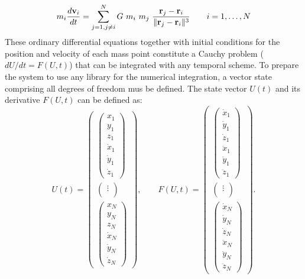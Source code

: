 \begin{equation} 
m_i \frac{d \bold{v}_i}{dt} =  \sum_{j=1, j \ne i} ^N G \ m_i \ m_j \ \frac{\bold{r}_j -\bold{r}_i}
                              {\|\bold{r}_j -\bold{r}_i \|^3}
                              \qquad i=1, \ldots,N 
\label{momentum}                              
\end{equation}
These ordinary differential equations together with initial conditions for the position 
and velocity of each mass point  constitute a Cauchy problem ($dU/dt = F(U,t)$) 
that can be integrated with any temporal scheme. 
To prepare the system to use any library for the numerical integration, a vector state comprising all 
degrees of freedom mus be defined. 
The state vector $ U(t) $ and its derivative $ F(U,t) $ can be  defined as: 
\begin{equation} 
U(t) =
\begin{pmatrix}
\begin{pmatrix}
  x_1 \\ y_1 \\ z_1 \\ \dot x_1 \\ \dot y_1 \\ \dot z_1 
\end{pmatrix}
\\
\begin{pmatrix}
  \vdots \\
\end{pmatrix}
\\
\begin{pmatrix}
  x_N \\ y_N \\ z_N \\ \dot x_N \\ \dot y_N \\ \dot z_N 
\end{pmatrix}
\end{pmatrix}, \qquad
F(U,t) =
\begin{pmatrix}
\begin{pmatrix}
  \dot x_1 \\ \dot y_1 \\ \dot z_1 \\ \ddot x_1 \\ \ddot y_1 \\ \ddot z_1 
\end{pmatrix}
\\
\begin{pmatrix}
  \vdots \\
\end{pmatrix}
\\
\begin{pmatrix}
  \dot x_N \\ \dot y_N \\ \dot z_N \\ \ddot x_N \\ \ddot y_N \\ \ddot z_N 
\end{pmatrix}
\end{pmatrix}.
\end{equation} 
